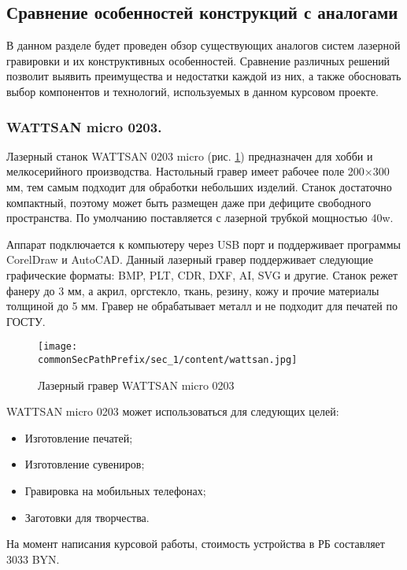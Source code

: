 \subsection{Сравнение особенностей конструкций с аналогами}
В данном разделе будет проведен обзор существующих аналогов систем лазерной гравировки и их конструктивных особенностей. 
Сравнение различных решений позволит выявить преимущества и недостатки каждой из них, а также обосновать 
выбор компонентов и технологий, используемых в данном курсовом проекте.

\subsubsection{WATTSAN micro 0203.}
Лазерный станок WATTSAN 0203 micro (рис. \ref{fig:wattsan}) предназначен для хобби и мелкосерийного производства.
Настольный гравер имеет рабочее поле 200×300 мм, тем самым подходит для обработки небольших изделий.
Станок достаточно компактный, поэтому может быть размещен даже при дефиците свободного пространства.
По умолчанию поставляется с лазерной трубкой мощностью 40w.

Аппарат подключается к компьютеру через USB порт и поддерживает программы CorelDraw и AutoCAD. 
Данный лазерный гравер поддерживает следующие графические форматы: BMP, PLT, CDR, DXF, AI, SVG и другие.
Станок режет фанеру до 3 мм, а акрил, оргстекло, ткань, резину, кожу и прочие материалы толщиной до 5 мм. 
Гравер не обрабатывает металл и не подходит для печатей по ГОСТУ.
\begin{figure}[ht]
    \centering
    \texttt{[image: \\commonSecPathPrefix/sec\_1/content/wattsan.jpg]}
    \caption{Лазерный гравер WATTSAN micro 0203}
    \label{fig:wattsan}
\end{figure}

WATTSAN micro 0203 может использоваться для следующих целей:
\begin{itemize}
    \item Изготовление печатей;
    \item Изготовление сувениров;
    \item Гравировка на мобильных телефонах;
    \item Заготовки для творчества.
\end{itemize}

На момент написания курсовой работы, стоимость устройства в РБ составляет 3033 BYN.


